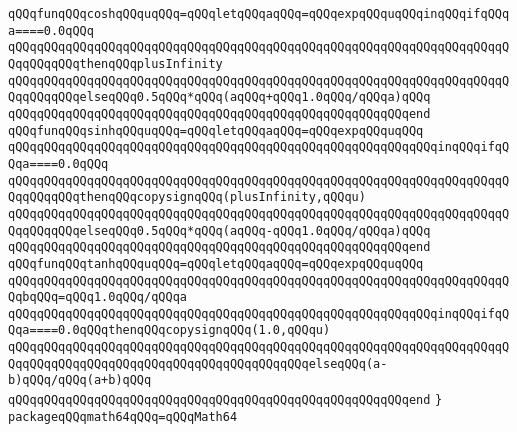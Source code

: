 \newline
\verb|qQQqfunqQQqcoshqQQquqQQq=qQQqletqQQqaqQQq=qQQqexpqQQquqQQqinqQQqifqQQqa====0.0qQQq|\newline
\verb|qQQqqQQqqQQqqQQqqQQqqQQqqQQqqQQqqQQqqQQqqQQqqQQqqQQqqQQqqQQqqQQqqQQqqQQqqQQqqQQqthenqQQqplusInfinity|\newline
\verb|qQQqqQQqqQQqqQQqqQQqqQQqqQQqqQQqqQQqqQQqqQQqqQQqqQQqqQQqqQQqqQQqqQQqqQQqqQQqqQQqelseqQQq0.5qQQq*qQQq(aqQQq+qQQq1.0qQQq/qQQqa)qQQq|\newline
\verb|qQQqqQQqqQQqqQQqqQQqqQQqqQQqqQQqqQQqqQQqqQQqqQQqqQQqqQQqend|\newline
\verb|qQQqfunqQQqsinhqQQquqQQq=qQQqletqQQqaqQQq=qQQqexpqQQquqQQq|\newline
\verb|qQQqqQQqqQQqqQQqqQQqqQQqqQQqqQQqqQQqqQQqqQQqqQQqqQQqqQQqqQQqinqQQqifqQQqa====0.0qQQq|\newline
\verb|qQQqqQQqqQQqqQQqqQQqqQQqqQQqqQQqqQQqqQQqqQQqqQQqqQQqqQQqqQQqqQQqqQQqqQQqqQQqqQQqthenqQQqcopysignqQQq(plusInfinity,qQQqu)|\newline
\verb|qQQqqQQqqQQqqQQqqQQqqQQqqQQqqQQqqQQqqQQqqQQqqQQqqQQqqQQqqQQqqQQqqQQqqQQqqQQqqQQqelseqQQq0.5qQQq*qQQq(aqQQq-qQQq1.0qQQq/qQQqa)qQQq|\newline
\verb|qQQqqQQqqQQqqQQqqQQqqQQqqQQqqQQqqQQqqQQqqQQqqQQqqQQqqQQqend|\newline
\verb|qQQqfunqQQqtanhqQQquqQQq=qQQqletqQQqaqQQq=qQQqexpqQQquqQQq|\newline
\verb|qQQqqQQqqQQqqQQqqQQqqQQqqQQqqQQqqQQqqQQqqQQqqQQqqQQqqQQqqQQqqQQqqQQqqQQqbqQQq=qQQq1.0qQQq/qQQqa|\newline
\verb|qQQqqQQqqQQqqQQqqQQqqQQqqQQqqQQqqQQqqQQqqQQqqQQqqQQqqQQqqQQqinqQQqifqQQqa====0.0qQQqthenqQQqcopysignqQQq(1.0,qQQqu)|\newline
\verb|qQQqqQQqqQQqqQQqqQQqqQQqqQQqqQQqqQQqqQQqqQQqqQQqqQQqqQQqqQQqqQQqqQQqqQQqqQQqqQQqqQQqqQQqqQQqqQQqqQQqqQQqqQQqqQQqelseqQQq(a-b)qQQq/qQQq(a+b)qQQq|\newline
\verb|qQQqqQQqqQQqqQQqqQQqqQQqqQQqqQQqqQQqqQQqqQQqqQQqqQQqqQQqend|\newline
\verb|}|\newline
\newline
\newline
\verb|packageqQQqmath64qQQq=qQQqMath64|\newline
\newline

